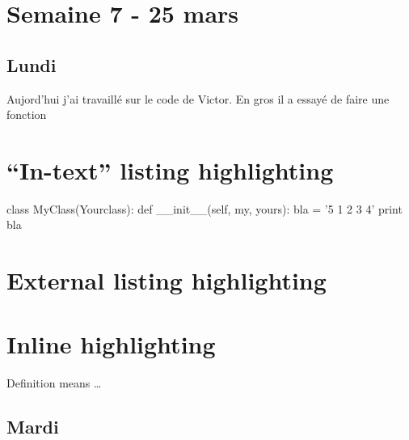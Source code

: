 \section{Semaine 7 - 25 mars}

\subsection{Lundi}

Aujord'hui j'ai travaillé sur le code de Victor. En gros il a essayé de faire une fonction 

\section{``In-text'' listing highlighting}

\begin{python}
class MyClass(Yourclass):
    def __init__(self, my, yours):
        bla = '5 1 2 3 4'
        print bla
\end{python}

\section{External listing highlighting}


\section{Inline highlighting}

Definition  means \dots

\subsection{Mardi}

